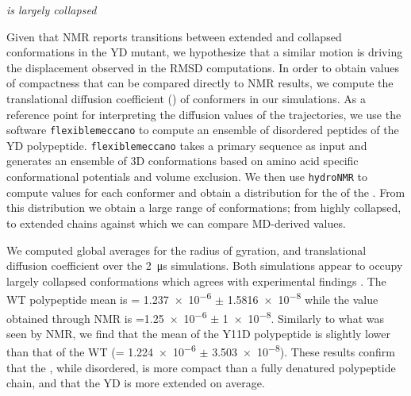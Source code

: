 {\it \gct is largely collapsed}

Given that NMR reports transitions between extended and collapsed conformations in the YD mutant, we hypothesize that a similar motion is driving the displacement observed in the RMSD computations. In order to obtain values of compactness that can be compared directly to NMR results, we compute the translational diffusion coefficient (\diffusion) of conformers in our simulations. As a reference point for interpreting the diffusion values of the trajectories, we use the software \texttt{flexiblemeccano} to compute an ensemble of disordered peptides of the YD polypeptide. \texttt{flexiblemeccano} takes a primary sequence as input and generates an ensemble of 3D conformations based on amino acid specific conformational potentials and volume exclusion. We then use \texttt{hydroNMR} to compute \diffusion values for each conformer and obtain a distribution for the \diffusion of the \gct. From this distribution  we obtain a large range of conformations; from highly collapsed, to extended chains against which we can compare MD-derived values.

We computed global averages for the radius of gyration, and translational diffusion coefficient over the \SI{2}{\us} simulations. Both simulations appear to occupy largely collapsed conformations which agrees with experimental findings . The WT polypeptide \diffusion mean is \diffusion = \num{1.237e-6} $\pm$ \SI{1.5816e-8}{\dcunits} while the value obtained through NMR is  \diffusion=\num{1.25e-6} $\pm$  \SI{1e-8}{\dcunits}. Similarly to what was seen by NMR, we find that the mean \diffusion of the Y11D \gct polypeptide is slightly lower than that of the WT \gct (\diffusion= \num{1.224e-6} $\pm$ \SI{3.503e-8}{\dcunits}). These results confirm that the \gct, while disordered, is more compact than a fully denatured polypeptide chain, and that the YD \gct is more extended on average.




\begin{figure}
	\centering     %
	\label{fig:fm}
\end{figure}

